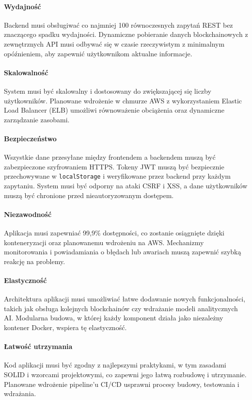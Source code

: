 \paragraph{Wydajność}
Backend musi obsługiwać co najmniej 100 równoczesnych zapytań REST bez znaczącego spadku wydajności. Dynamiczne pobieranie danych blockchainowych z zewnętrznych API musi odbywać się w czasie rzeczywistym z minimalnym opóźnieniem, aby zapewnić użytkownikom aktualne informacje.

\paragraph{Skalowalność}
System musi być skalowalny i dostosowany do zwiększającej się liczby użytkowników. Planowane wdrożenie w chmurze AWS z wykorzystaniem Elastic Load Balancer (ELB) umożliwi równoważenie obciążenia oraz dynamiczne zarządzanie zasobami.

\paragraph{Bezpieczeństwo}
Wszystkie dane przesyłane między frontendem a backendem muszą być zabezpieczone szyfrowaniem HTTPS. Tokeny JWT muszą być bezpiecznie przechowywane w \texttt{localStorage} i weryfikowane przez backend przy każdym zapytaniu. System musi być odporny na ataki CSRF i XSS, a dane użytkowników muszą być chronione przed nieautoryzowanym dostępem.

\paragraph{Niezawodność}
Aplikacja musi zapewniać 99,9\% dostępności, co zostanie osiągnięte dzięki konteneryzacji oraz planowanemu wdrożeniu na AWS. Mechanizmy monitorowania i powiadamiania o błędach lub awariach muszą zapewnić szybką reakcję na problemy.

\paragraph{Elastyczność}
Architektura aplikacji musi umożliwiać łatwe dodawanie nowych funkcjonalności, takich jak obsługa kolejnych blockchainów czy wdrażanie modeli analitycznych AI. Modularna budowa, w której każdy komponent działa jako niezależny kontener Docker, wspiera tę elastyczność.

\paragraph{Łatwość utrzymania}
Kod aplikacji musi być zgodny z najlepszymi praktykami, w tym zasadami SOLID i wzorcami projektowymi, co zapewni jego łatwą rozbudowę i utrzymanie. Planowane wdrożenie pipeline'u CI/CD usprawni procesy budowy, testowania i wdrażania.

